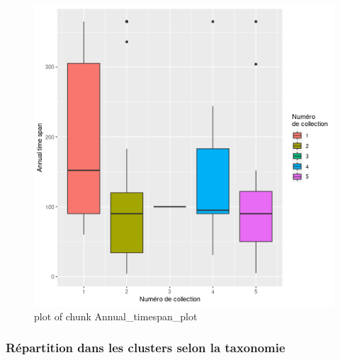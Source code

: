\begin{figure}
\centering
\includegraphics{figure/Annual_timespan_plot-1.png}
\caption{plot of chunk Annual\_timespan\_plot}
\end{figure}

\hypertarget{ruxe9partition-dans-les-clusters-selon-la-taxonomie}{%
\subsubsection{Répartition dans les clusters selon la
taxonomie}\label{ruxe9partition-dans-les-clusters-selon-la-taxonomie}}

